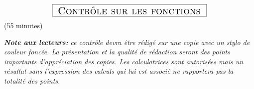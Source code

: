 \documentclass[a4paper,10.9pt]{article}
\theoremstyle{definition}
\begin{document}

\chead{}\renewcommand{\headrulewidth}{0.4pt}\renewcommand{\footrulewidth}{0.4pt}

\hfill\\[-0.7cm]
$$	\fbox{\text{\Large{ \sc Contrôle sur les fonctions }}}$$
\centering \Large{ (55 minutes) }\\[0.5cm]

\flushleft\normalsize


\textbf{\textit{Note aux lecteurs:}} \textit{ce contrôle devra être rédigé sur une copie avec un stylo de couleur foncée. La présentation et la qualité de rédaction seront des points importants d'appréciation des copies.  Les calculatrices sont autorisées mais un résultat sans l'expression des calculs qui lui est associé ne rapportera pas la totalité des points.}\\[0.7cm]	
\end{document}
